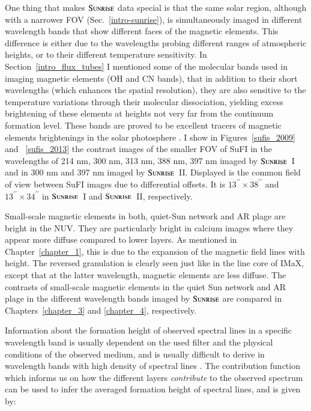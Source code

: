 \documentclass[goettingen, gauss, print]{thesis}
\begin{document}
One thing that makes $\textsc{Sunrise}$ data special is that the same solar region, although with a narrower FOV (Sec.~\ref{intro-sunrise}), is simultaneously imaged in different wavelength bands that show different faces of the magnetic elements. This difference is either due to the wavelengths probing different ranges of atmospheric heights, or to their different temperature sensitivity. In Section~\ref{intro_flux_tubes} I mentioned some of the molecular bands used in imaging magnetic elements (OH and CN bands), that in addition to their short wavelengths (which enhances the spatial resolution), they are also sensitive to the temperature variations through their molecular dissociation, yielding excess brightening of these elements at heights not very far from the continuum formation level. These bands are proved to be excellent tracers of magnetic elements brightenings in the solar photosphere \citep{berdyugina_molecular_2003}.
I show in Figures~\ref{sufis_2009} and ~\ref{sufis_2013} the contrast images of the smaller FOV of SuFI in the wavelengths of 214 nm, 300 nm, 313 nm, 388 nm, 397 nm imaged by $\textsc{Sunrise}$~I and in 300 nm and 397 nm imaged by $\textsc{Sunrise}$~II. Displayed is the common field of view between SuFI images due to differential offsets. It is $13^{\prime\prime}\times38^{\prime\prime}$ and $13^{\prime\prime}\times34^{\prime\prime}$ in $\textsc{Sunrise}$~I and $\textsc{Sunrise}$~II, respectively.

Small-scale magnetic elements in both, quiet-Sun network and AR plage are bright in the NUV. They are particularly bright in calcium images where they appear more diffuse compared to lower layers. As mentioned in Chapter~\ref{chapter_1}, this is due to the expansion of the magnetic field lines with height. The reversed granulation is clearly seen just like in the line core of IMaX, except that at the latter wavelength, magnetic elements are less diffuse. The contrasts of small-scale magnetic elements in the quiet Sun network and AR plage in the different wavelength bands imaged by $\textsc{Sunrise}$ are compared in Chapters~\ref{chapter_3} and \ref{chapter_4}, respectively.

Information about the formation height of observed spectral lines in a specific wavelength band is usually dependent on the used filter and the physical conditions of the observed medium, and is usually difficult to derive in wavelength bands with high density of spectral lines \citep{solanki_sunrise:_2010}. The contribution function which informs us on how the different layers \textit{contribute} to the observed spectrum can be used to infer the averaged formation height of spectral lines, and is given by: 
\end{document}
